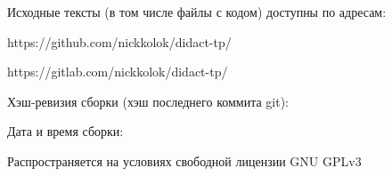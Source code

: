 Исходные тексты (в том числе файлы с кодом) доступны по адресам:

https://github.com/nickkolok/didact-tp/

https://gitlab.com/nickkolok/didact-tp/

Хэш-ревизия сборки (хэш последнего коммита git):


Дата и время сборки:


Распространяется на условиях свободной лицензии GNU GPLv3
